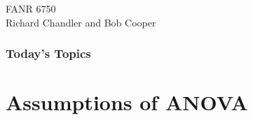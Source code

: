 \documentclass[color=usenames,dvipsnames]{beamer}\usepackage[]{graphicx}\usepackage[]{color}
\begin{document}

\begin{frame}[plain]
  \LARGE
  \centering \par
  {\bf \color{RoyalBlue}{Lab 5 -- Assumptions of ANOVA}} \par
  \vspace{1cm}
  \Large
  FANR 6750 \\
  \vfill
  \large
  Richard Chandler and Bob Cooper
\end{frame}





\begin{frame}[plain]
  \frametitle{Today's Topics}
  \Large
\end{frame}






\section{Assumptions of ANOVA}












\end{document}
